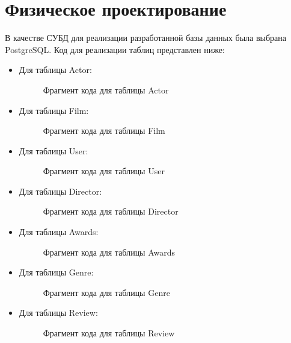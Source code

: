 \section{Физическое проектирование}
В качестве СУБД для реализации разработанной базы данных была выбрана
PostgreSQL. Код для реализации таблиц представлен ниже:
\begin{itemize}
\item Для таблицы Actor:
\begin{figure} [h]
    \caption{Фрагмент кода для таблицы Actor}
\end{figure}

\item  Для таблицы Film:
\begin{figure} [h]
    \caption{Фрагмент кода для таблицы Film}
\end{figure}

\item Для таблицы User:
\begin{figure} [h]
    \caption{Фрагмент кода для таблицы User}
\end{figure}

\item Для таблицы Director:
\begin{figure} [h]
    \caption{Фрагмент кода для таблицы Director}
\end{figure}

\item Для таблицы Awards:
\begin{figure} [h]
    \caption{Фрагмент кода для таблицы Awards}
\end{figure}

\item Для таблицы Genre:
\begin{figure} [h]
    \caption{Фрагмент кода для таблицы Genre}
\end{figure}

\item Для таблицы Review:
\begin{figure} [h]
    \caption{Фрагмент кода для таблицы Review}
\end{figure}


\end{itemize}
